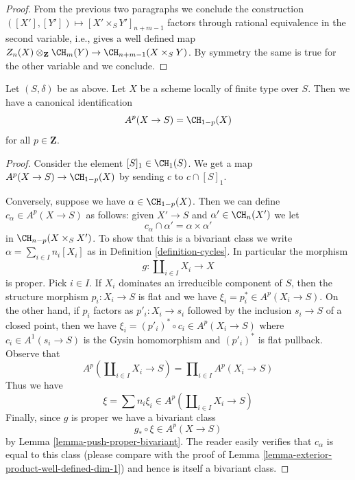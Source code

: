\begin{proof}
\medskip\noindent
From the previous two paragraphs we conclude
the construction $([X'], [Y']) \mapsto [X' \times_S Y']_{n + m - 1}$
factors through rational equivalence in the second variable, i.e.,
gives a well defined map
$Z_n(X) \otimes_{\mathbf{Z}} \CH_m(Y) \to \CH_{n + m - 1}(X \times_S Y)$.
By symmetry the same is true for the other variable and we conclude.
\end{proof}

\begin{lemma}
\label{lemma-chow-cohomology-towards-base-dim-1}
Let $(S, \delta)$ be as above. Let $X$ be a scheme locally of finite type
over $S$. Then we have a canonical identification
$$
A^p(X \to S) = \CH_{1 - p}(X)
$$
for all $p \in \mathbf{Z}$.
\end{lemma}

\begin{proof}
Consider the element $[S]_1 \in \CH_1(S)$. We get a map
$A^p(X \to S) \to \CH_{1 - p}(X)$ by sending $c$ to $c \cap [S]_1$.

\medskip\noindent
Conversely, suppose we have $\alpha \in \CH_{1 - p}(X)$.
Then we can define $c_\alpha \in A^p(X \to S)$ as
follows: given $X' \to S$ and $\alpha' \in \CH_n(X')$
we let
$$
c_\alpha \cap \alpha' = \alpha \times \alpha'
$$
in $\CH_{n - p}(X \times_S X')$. To show that this is a bivariant
class we write $\alpha = \sum_{i \in I} n_i[X_i]$ as in
Definition \ref{definition-cycles}. In particular the morphism
$$
g : \coprod\nolimits_{i \in I} X_i \longrightarrow X
$$
is proper. Pick $i \in I$. If $X_i$ dominates an irreducible component
of $S$, then the structure morphism $p_i : X_i \to S$ is flat and we have
$\xi_i = p_i^* \in A^p(X_i \to S)$. On the other hand, if $p_i$ factors
as $p'_i : X_i \to s_i$ followed by the inclusion $s_i \to S$
of a closed point, then we have
$\xi_i = (p'_i)^* \circ c_i \in A^p(X_i \to S)$
where $c_i \in A^1(s_i \to S)$ is the Gysin homomorphism and
$(p'_i)^*$ is flat pullback. Observe that
$$
A^p(\coprod\nolimits_{i \in I} X_i \to S) =
\prod\nolimits_{i \in I} A^p(X_i \to S)
$$
Thus we have
$$
\xi = \sum n_i \xi_i \in A^p(\coprod\nolimits_{i \in I} X_i \to S)
$$
Finally, since $g$ is proper we have a bivariant class
$$
g_* \circ \xi \in A^p(X \to S)
$$
by Lemma \ref{lemma-push-proper-bivariant}. The reader easily
verifies that $c_\alpha$ is equal to this class
(please compare with the proof of
Lemma \ref{lemma-exterior-product-well-defined-dim-1})
and hence is itself a bivariant class.


\end{proof}
